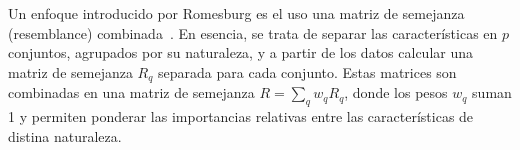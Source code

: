 \documentclass[spanish]{article}
\begin{document}
Un enfoque introducido por Romesburg es el uso una matriz de semejanza (resemblance)
combinada~\footnotemark.  En esencia, se trata de separar las características en $p$ conjuntos,
agrupados por su naturaleza, y a partir de los datos calcular una matriz de semejanza $R_q$ separada
para cada conjunto.
Estas matrices son combinadas en una matriz de semejanza $R = \sum_q w_q R_q$, donde los pesos $w_q$
suman 1 y permiten ponderar las importancias relativas entre las características de distina
naturaleza.


%
%
\end{document}
